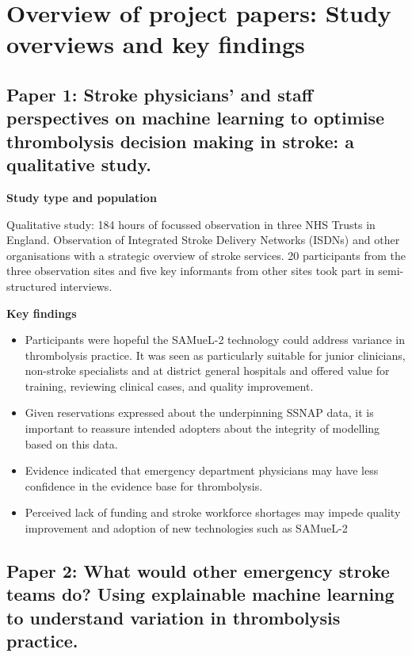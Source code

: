 \section{Overview of project papers: Study overviews and key findings}
\label{sec:papers}

\subsection{Paper 1: Stroke physicians' and staff perspectives on machine learning to optimise thrombolysis decision making in stroke: a qualitative study. \cite{jarvie_stroke_2024}}

\textbf{Study type and population}

Qualitative study: 184 hours of focussed observation in three NHS Trusts in England. Observation of Integrated Stroke Delivery Networks (ISDNs) and other organisations with a strategic overview of stroke services. 20 participants from the three observation sites and five key informants from other sites took part in semi-structured interviews.

\textbf{Key findings}

\begin{itemize}
    \item Participants were hopeful the SAMueL-2 technology could address variance in thrombolysis practice. It was seen as particularly suitable for junior clinicians, non-stroke specialists and at district general hospitals and offered value for training, reviewing clinical cases, and quality improvement.

    \item Given reservations expressed about the underpinning SSNAP data, it is important to reassure intended adopters about the integrity of modelling based on this data.

    \item Evidence indicated that emergency department physicians may have less confidence in the evidence base for thrombolysis.

    \item Perceived lack of funding and stroke workforce shortages may impede quality improvement and adoption of new technologies such as SAMueL-2

\end{itemize}


\subsection{Paper 2: What would other emergency stroke teams do? Using explainable machine learning to understand variation in thrombolysis practice.\cite{pearn_what_2023}}

